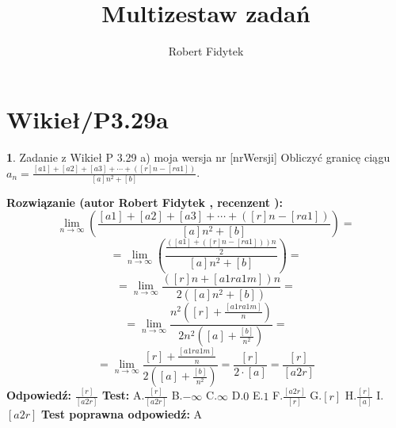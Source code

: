 \documentclass[12pt, a4paper]{article}
\title{Multizestaw zadań}
\author{Robert Fidytek}
\date{}
\theoremstyle{definition} %
\newtheorem{zad}{}
\newcommand{\kategoria}[1]{\section{#1}} %
\newcommand{\zadStart}[1]{\begin{zad}#1\newline} %
\newcommand{\zadStop}{\end{zad}}   %
\newcommand{\rozwStart}[2]{\noindent \textbf{Rozwiązanie (autor #1 , recenzent #2): }\newline} %
\newcommand{\rozwStop}{\newline}                                            %
\newcommand{\odpStart}{\noindent \textbf{Odpowiedź:}\newline}    %
\newcommand{\odpStop}{\newline}                                             %
\newcommand{\testStart}{\noindent \textbf{Test:}\newline} %
\newcommand{\testStop}{\newline} %
\newcommand{\kluczStart}{\noindent \textbf{Test poprawna odpowiedź:}\newline} %
\newcommand{\kluczStop}{\newline} %
\begin{document}
\maketitle


\kategoria{Wikieł/P3.29a}
\zadStart{Zadanie z Wikieł P 3.29 a) moja wersja nr [nrWersji]}
Obliczyć granicę ciągu $a_{n}=\frac{[a1]+[a2]+[a3]+\cdots+([r]n-[ra1])}{[a]n^2+[b]}$.
\zadStop
\rozwStart{Robert Fidytek}{}
$$\lim\limits_{n\to\infty}\left(\frac{[a1]+[a2]+[a3]+\cdots+([r]n-[ra1])}{[a]n^2+[b]}\right)=$$ 
$$=\lim\limits_{n\to\infty}\left(\frac{\frac{([a1]+([r]n-[ra1]))n}{2}}{[a]n^2+[b]}\right)=$$ 
$$=\lim\limits_{n\to\infty}\frac{([r]n+[a1ra1m])n}{2\left([a]n^2+[b]\right)}=$$ 
$$=\lim\limits_{n\to\infty}\frac{n^2\left([r]+\frac{[a1ra1m]}{n}\right)}{2n^2\left([a]+\frac{[b]}{n^2}\right)}=$$ 
$$=\lim\limits_{n\to\infty}\frac{[r]+\frac{[a1ra1m]}{n}}{2\left([a]+\frac{[b]}{n^2}\right)}=\frac{[r]}{2\cdot[a]}=\frac{[r]}{[a2r]}$$ 
\rozwStop
\odpStart
$\frac{[r]}{[a2r]}$
\odpStop
\testStart
A.$\frac{[r]}{[a2r]}$
B.$-\infty$
C.$\infty$
D.$0$
E.$1$
F.$\frac{[a2r]}{[r]}$
G.$[r]$
H.$\frac{[r]}{[a]}$
I.$[a2r]$
\testStop
\kluczStart
A
\kluczStop
\end{document}
